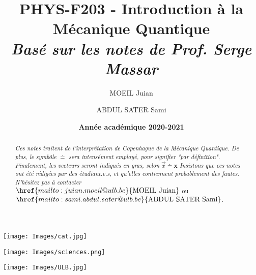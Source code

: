 \documentclass[a4paper]{article}
\title{\textbf{PHYS-F203 - Introduction à la Mécanique Quantique} \\ \textit{Basé sur les notes de Prof. Serge Massar}}
\author{MOEIL Juian \and ABDUL SATER Sami}
\date{\textbf{Année académique 2020-2021}}
\numberwithin{equation}{part}
\begin{document}
\maketitle
\begin{center}
    \texttt{[image: Images/cat.jpg]}
\end{center}
\begin{center}
    \texttt{[image: Images/sciences.png]}
\end{center}
\begin{center}
    \texttt{[image: Images/ULB.jpg]}
\end{center}

\newpage
\tableofcontents

\newpage
\begin{abstract}
\textit{Ces notes traitent de l'interprétation de Copenhague de la Mécanique Quantique. De plus, le symbôle $\doteq$ sera intensément employé, pour signifier "par définition". Finalement, les vecteurs seront indiqués en gras, selon $\vec{x} \doteq \bm{x}$ Insistons que ces notes ont été rédigées par des étudiant.e.s, et qu'elles contiennent probablement des fautes. N'hésitez pas à contacter $\href{mailto:juian.moeil@ulb.be}{\text{MOEIL Juian}}$} ou $\href{mailto:sami.abdul.sater@ulb.be}{\text{ABDUL SATER Sami}}$. 
\end{abstract}

\newpage

\newpage

\newpage

\newpage

\newpage

\newpage

\newpage


\newpage

\end{document}

